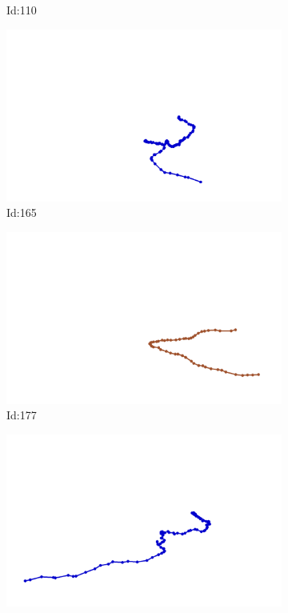 \documentclass[12pt,twoside]{report}
\begin{document}
\begin{figure}
\begin{subfigure}[b]{0.20\textwidth}
\caption{Id:110}
\end{subfigure}
\begin{subfigure}[b]{0.20\textwidth}
\centering
\includegraphics[width=\textwidth]{../trajectories/165.png}
\caption{Id:165}
\end{subfigure}
\begin{subfigure}[b]{0.20\textwidth}
\centering
\includegraphics[width=\textwidth]{../trajectories/177.png}
\caption{Id:177}
\end{subfigure}
\begin{subfigure}[b]{0.20\textwidth}
\centering
\includegraphics[width=\textwidth]{../trajectories/207.png}

\end{subfigure}
\end{figure}
\end{document}
